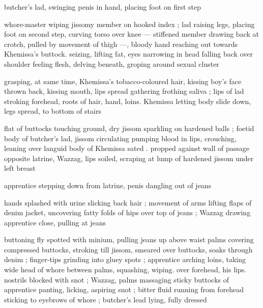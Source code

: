 butcher's lad, swinging penis in hand, placing foot on first step

whore-master wiping jissomy member on hooked index ; lad raising
legs, placing foot on second step, curving torso over knee —
stiffened member drawing back at crotch, pulled by movement of
thigh —, bloody hand reaching out towards Khemissa’s buttock.
seizing, lifting fat, eyes narrowing in head falling back over shoulder
feeling flesh, delving beneath, groping around sexual cluster

grasping, at same time, Khemissa's tobacco-coloured hair, kissing
boy's face thrown back, kissing mouth, lips spread gathering frothing
saliva ; lips of lad stroking forehead, roots of hair, hand, loins.
Khemissa letting body slide down, legs spread, to bottom of stairs

flat of buttocks touching ground, dry jissom sparkling on hardened
balls ; foetid body of butcher's lad, jissom circulating pumping blood
in lips, crouching, leaning over languid body of Khemissa sated .
propped against wall of passage opposite latrine, Wazzag, lips
soiled, scraping at lump of hardened jissom under left breast

apprentice stepping down from latrine, penis dangling out of jeans

hands splashed with urine slicking back hair ; movement of arms
lifting flaps of denim jacket, uncovering fatty folds of hips over top
of jeans ; Wazzag drawing apprentice close, pulling at jeans

buttoning fly spotted with minium, pulling jeans up above waist
palms covering compressed buttocks, stroking till jissom, smeared
over buttocks, soaks through denim ; finger-tips grinding into gluey
spots ; apprentice arching loins, taking wide head of whore between
palms, squashing, wiping. over forehead, his lips. nostrils blocked
with snot ; Wazzag, palms massaging sticky buttocks of apprentice
panting, licking, aspiring snot ; bitter fluid running from forehead
sticking to eyebrows of whore ; butcher's lead lying, fully dressed

